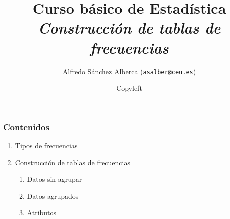 
\title{Curso básico de Estadística\\
{\bfseries \emph{Construcción de tablas de frecuencias}}}
\author[]{Alfredo Sánchez Alberca (\texttt{\url{asalber@ceu.es}})} 
\date{\textcopyleft Copyleft}

\begin{frame}
\titlepage
\end{frame}


\begin{frame}
\frametitle{Contenidos}
\videobox
\begin{enumerate}
\item Tipos de frecuencias
\item Construcción de tablas de frecuencias 
\begin{enumerate}
\item Datos sin agrupar
\item Datos agrupados
\item Atributos
\end{enumerate}
\end{enumerate}
\end{frame}


